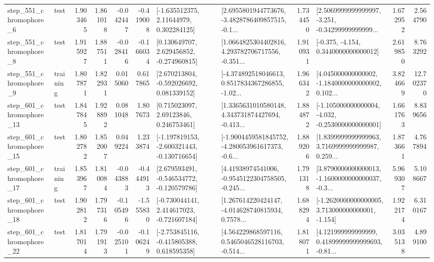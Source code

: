 \begin{tabular}{llrrrrllrlrr}
   step\_551\_chromophore\_6 &      test &      1.903465 &    1.861018 &     -0.042447 & -0.419008 &     [-1.635512375, 2.11644979, 0.302284125] &  [2.6955801944773676, -3.4828786409857515, -0.1... &       1.734450 &  [2.5069999999999997, -3.251, -0.34299999999999... &            1.672952 &          2.564790 \\
   step\_551\_chromophore\_8 &      test &      1.915927 &    1.887511 &     -0.028416 & -0.166034 &    [0.130649707, 2.629456852, -0.274960815] &  [1.0664825304402816, 4.293782706717556, -0.351... &       1.910931 &               [-0.375, -4.154, 0.3440000000000012] &            2.619850 &          8.763292 \\
   step\_551\_chromophore\_9 &  training &      1.807871 &    1.822931 &      0.015060 &  0.617865 &    [2.670213804, -0.592026692, 0.081339152] &  [-4.374892518046613, 0.8517834367286855, -1.02... &       1.966342 &  [4.045000000000002, -1.1840000000000002, 0.102... &            3.824669 &         12.702370 \\
  step\_601\_chromophore\_13 &      test &      1.847845 &    1.928892 &      0.081048 &  1.807673 &      [0.715023097, 2.69123846, 0.246753461] &  [1.3365631010580148, 4.343731874427694, -0.413... &       1.884872 &  [-1.105000000000004, -4.032, -0.2530000000000001] &            1.661763 &          8.839656 \\
  step\_601\_chromophore\_15 &      test &      1.802782 &    1.852007 &      0.049224 &  1.233874 &  [-1.197819153, -2.600321443, -0.130716654] &  [-1.9004459581845752, -4.280053961617373, -0.6... &       1.889206 &  [1.8399999999999963, 3.7169999999999987, 0.259... &            1.873661 &          4.767894 \\
  step\_601\_chromophore\_17 &  training &      1.853967 &    1.810084 &     -0.043883 & -0.444913 &   [2.679593491, -0.546534772, -0.120579786] &  [4.41938974541006, -0.9545122304758505, -0.245... &       1.791318 &  [3.8790000000000013, -1.1600000000000037, -0.3... &            5.969307 &          5.108667 \\
  step\_601\_chromophore\_18 &      test &      1.902812 &    1.797316 &     -0.105496 & -1.555830 &   [-0.730044141, 2.414617023, -0.721607184] &  [1.267614220424147, -4.014628740815934, 0.7578... &       1.688294 &   [-1.2620000000000005, 3.713000000000001, -1.154] &            1.922174 &          6.310167 \\
  step\_601\_chromophore\_22 &      test &      1.817014 &    1.791913 &     -0.025101 & -0.106249 &   [-2.753845116, -0.415805388, 0.618595358] &  [4.564229868597116, 0.5465046528116703, -0.514... &       1.818071 &  [4.121999999999999, 0.41899999999999693, -0.81... &            3.035138 &          4.899100 \\

\end{tabular}
